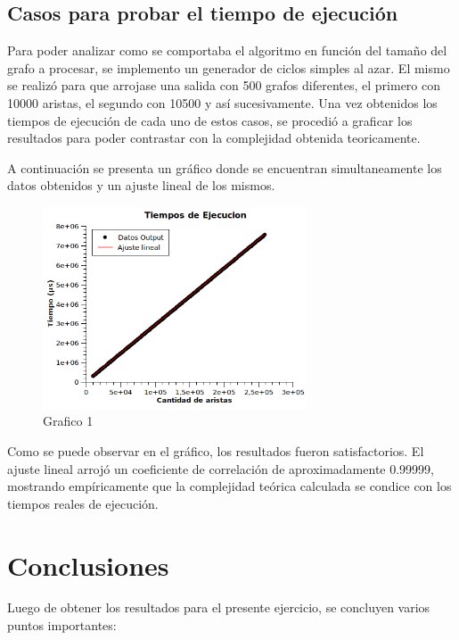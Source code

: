 \documentclass[a4paper, 12pt]{article}
\begin{document}
\subsection*{Casos para probar el tiempo de ejecuci\'on}
Para poder analizar como se comportaba el algoritmo en funci\'on del tama\~{n}o del grafo a procesar, se implemento un generador de ciclos simples al azar. El mismo se realiz\'o para que arrojase una salida con 500 grafos diferentes, el primero con 10000 aristas, el segundo con 10500 y as\'i sucesivamente. Una vez obtenidos los tiempos de ejecuci\'on de cada uno de estos casos, se procedi\'o a graficar los resultados para poder contrastar con la complejidad obtenida teoricamente.

A continuaci\'on se presenta un gr\'afico donde se encuentran simultaneamente los datos obtenidos y un ajuste lineal de los mismos.


\begin{figure}[H]
\centering
\includegraphics[width=0.7\textwidth]{imagenes/Resultados1.png} 
\caption{Grafico 1}
\end{figure}

Como se puede observar en el gr\'afico, los resultados fueron satisfactorios. El ajuste lineal arroj\'o un coeficiente de correlaci\'on de aproximadamente 0.99999, mostrando emp\'iricamente que la complejidad te\'orica calculada se condice con los tiempos reales de ejecuci\'on. 

\section*{Conclusiones}

Luego de obtener los resultados para el presente ejercicio, se concluyen varios puntos importantes:
\end{document}
